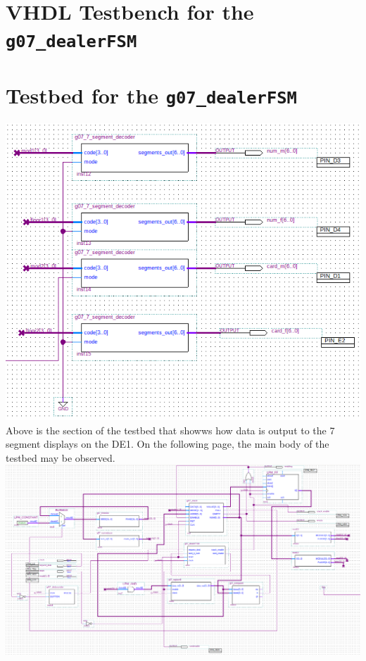 \documentclass[12pt]{report}
\begin{document}
\begin{appendix}
	\chapter{VHDL Testbench for the \texttt{g07\_dealerFSM}}
	\label{a:dealertst}
	
	\chapter{Testbed for the \texttt{g07\_dealerFSM}}
	\label{a:testbed}
	\includegraphics[scale=0.8,angle=0]{testbed_led}\\
	Above is the section of the testbed that showws how data is output to the 7 segment displays on
	the DE1. On the following page, the main body of the testbed may be observed.
	\includegraphics[scale=0.5,angle=270]{testbed_body}

\end{appendix}
\end{document}
